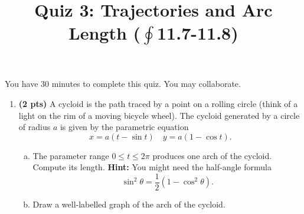 \documentclass[12pt]{article}
\title{\flushleft\vspace{-1.5pc}\Large
	\bf Quiz 3: Trajectories and Arc Length ($\textstyle\oint$11.7-11.8)}
\author{}
\date{}
\begin{document}
\maketitle

\vspace{-3pc}
 You have 30 minutes to complete this quiz.  You may collaborate.  

\vspace{1pc}
\begin{enumerate}[1.]
\item {\bf (2 pts)} A cycloid is the path traced by a point on a rolling circle (think of a light on the rim of a moving bicycle wheel).  The cycloid generated by a circle of radius $a$ is given by the parametric equation 
\[
x=a(t-\sin{t}) \quad y=a(1-\cos{t}).
\]
\begin{enumerate}[(a)]
\item The parameter range $0\leq t\leq 2\pi$ produces one arch of the cycloid.  Compute its length.  {\bf Hint:} You might need the half-angle formula
\[
\sin^2{\theta}=\frac{1}{2}\left(1-\cos^2{\theta}\right).
\]
\vspace{10pc}

\item Draw a well-labelled graph of the arch of the cycloid.
\end{enumerate}


\end{enumerate}
\end{document}
